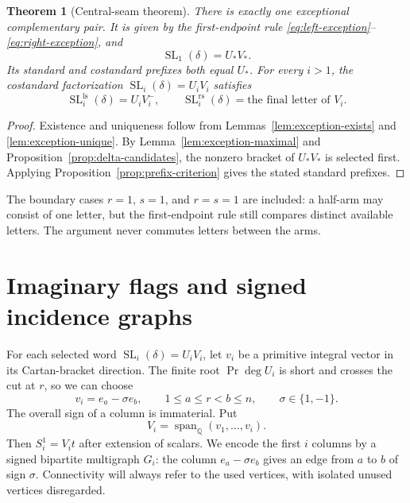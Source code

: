 \documentclass[11pt]{amsart}
\numberwithin{equation}{section}
\newtheorem{theorem}{Theorem}[section]
\theoremstyle{definition}
\DeclareMathOperator{\SL}{SL}
\DeclareMathOperator{\Prj}{Pr}
\DeclareMathOperator{\Span}{span}
\newcommand{\Q}{\mathbb Q}
\newcommand{\ls}{\mathrm{ls}}
\newcommand{\rs}{\mathrm{rs}}
\begin{document}
\begin{theorem}[Central-seam theorem]\label{thm:central-seam}
There is exactly one exceptional complementary pair. It is given by the first-endpoint rule \eqref{eq:left-exception}--\eqref{eq:right-exception}, and
\[
 \SL_1(\delta)=U_*V_*.
\]
Its standard and costandard prefixes both equal $U_*$. For every $i>1$, the costandard factorization $\SL_i(\delta)=U_iV_i$ satisfies
\begin{equation}\label{eq:noninitial-prefix}
 \SL_i^{\ls}(\delta)=U_iV_i^{-},
 \qquad
 \SL_i^{\rs}(\delta)=\text{the final letter of }V_i.
\end{equation}
\end{theorem}
\begin{proof}
Existence and uniqueness follow from Lemmas~\ref{lem:exception-exists} and \ref{lem:exception-unique}. By Lemma~\ref{lem:exception-maximal} and Proposition~\ref{prop:delta-candidates}, the nonzero bracket of $U_*V_*$ is selected first. Applying Proposition~\ref{prop:prefix-criterion} gives the stated standard prefixes.
\end{proof}

The boundary cases $r=1$, $s=1$, and $r=s=1$ are included: a half-arm may consist of one letter, but the first-endpoint rule still compares distinct available letters. The argument never commutes letters between the arms.

\section{Imaginary flags and signed incidence graphs}\label{sec:flags}

For each selected word $\SL_i(\delta)=U_iV_i$, let $v_i$ be a primitive integral vector in its Cartan-bracket direction. The finite root $\Prj\deg U_i$ is short and crosses the cut at $r$, so we can choose
\[
 v_i=e_a-\sigma e_b,
 \qquad 1\leq a\leq r<b\leq n,
 \qquad \sigma\in\{1,-1\}.
\]
The overall sign of a column is immaterial. Put
\[
 V_i=\Span_{\Q}(v_1,\ldots,v_i).
\]
Then $S_i^1=V_it$ after extension of scalars. We encode the first $i$ columns by a signed bipartite multigraph $G_i$: the column $e_a-\sigma e_b$ gives an edge from $a$ to $b$ of sign $\sigma$. Connectivity will always refer to the used vertices, with isolated unused vertices disregarded.
\end{document}
